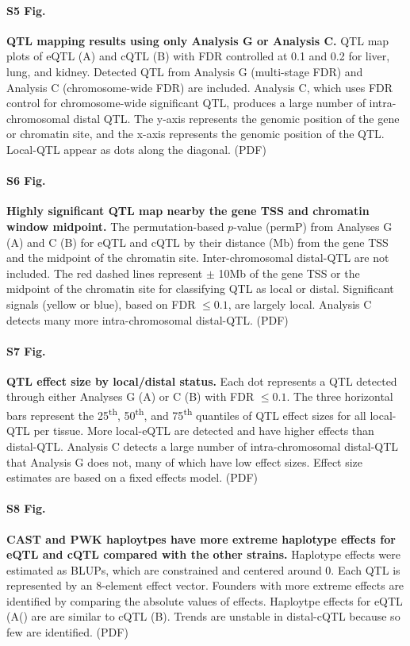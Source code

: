 \documentclass[10pt,letterpaper]{article}
\begin{document}
\paragraph*{S5 Fig.}
\label{S_grid_plot_lenient}
{\bf QTL mapping results using only Analysis G or Analysis C.}
QTL map plots of eQTL (A) and cQTL (B) with FDR controlled at 0.1 and 0.2 for liver, lung, and kidney. Detected QTL from Analysis G (multi-stage FDR) and Analysis C (chromosome-wide FDR) are included. Analysis C, which uses FDR control for chromosome-wide significant QTL, produces a large number of intra-chromosomal distal QTL. The y-axis represents the genomic position of the gene or chromatin site, and the x-axis represents the genomic position of the QTL. Local-QTL appear as dots along the diagonal. (PDF)

\paragraph*{S6 Fig.}
\label{S_dist}
{\bf Highly significant QTL map nearby the gene TSS and chromatin window midpoint.}
The permutation-based $p$-value (permP) from Analyses G (A) and C (B) for eQTL and cQTL by their distance (Mb) from the gene TSS and the midpoint of the chromatin site. Inter-chromosomal distal-QTL are not included. The red dashed lines represent $\pm$ 10Mb of the gene TSS or the midpoint of the chromatin site for classifying QTL as local or distal. Significant signals (yellow or blue), based on FDR $\le 0.1$, are largely local. Analysis C detects many more intra-chromosomal distal-QTL. (PDF)

\paragraph*{S7 Fig.}
\label{S_effect_size_status}
{\bf QTL effect size by local/distal status.}
Each dot represents a QTL detected through either Analyses G (A) or C (B) with FDR $\le 0.1$. The three horizontal bars represent the 25\textsuperscript{th}, 50\textsuperscript{th}, and 75\textsuperscript{th} quantiles of QTL effect sizes for all local-QTL per tissue. More local-eQTL are detected and have higher effects than distal-QTL. Analysis C detects a large number of intra-chromosomal distal-QTL that Analysis G does not, many of which have low effect sizes. Effect size estimates are based on a fixed effects model. (PDF)

\paragraph*{S8 Fig.}
\label{S_qtl_effects_abs}
{\bf CAST and PWK haploytpes have more extreme haplotype effects for eQTL and cQTL compared with the other strains.}
Haplotype effects were estimated as BLUPs, which are constrained and centered around 0. Each QTL is represented by an 8-element effect vector. Founders with more extreme effects are identified by comparing the absolute values of effects. Haploytpe effects for eQTL (A() are are similar to cQTL (B). Trends are unstable in distal-cQTL because so few are identified. (PDF)
\end{document}
